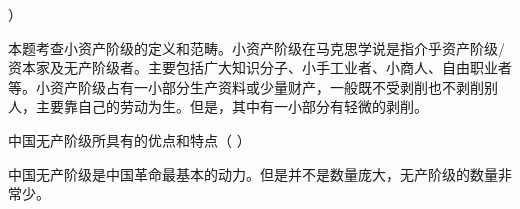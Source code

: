 ）
\par\twoch{\textcolor{red}{知识分子}}{\textcolor{red}{小商小贩}}{\textcolor{red}{手工业者}}{\textcolor{red}{自由职业者}}
\begin{solution}本题考查小资产阶级的定义和范畴。小资产阶级在马克思学说是指介乎资产阶级/资本家及无产阶级者。主要包括广大知识分子、小手工业者、小商人、自由职业者等。小资产阶级占有一小部分生产资料或少量财产，一般既不受剥削也不剥削别人，主要靠自己的劳动为生。但是，其中有一小部分有轻微的剥削。
\end{solution}
\question 中国无产阶级所具有的优点和特点（ ）
\par{}
\begin{solution}中国无产阶级是中国革命最基本的动力。但是并不是数量庞大，无产阶级的数量非常少。
\end{solution}
